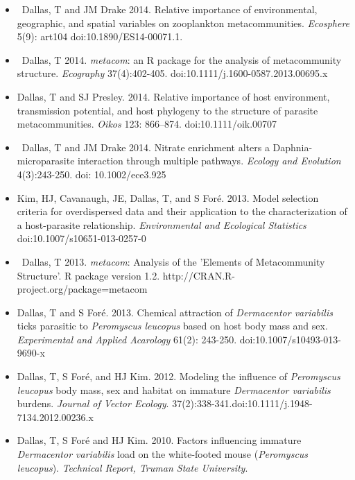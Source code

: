 \documentclass[]{CV}
\begin{document}
\begin{itemize}

\item \OA \ {\mefont Dallas, T} and JM Drake 2014. Relative importance of environmental, geographic, and spatial variables on zooplankton metacommunities. \textit{Ecosphere} 5(9): art104 doi:10.1890/ES14-00071.1.

\item \OA \ {\mefont Dallas, T} 2014. \textit{metacom}: an R package for the analysis of metacommunity structure. \textit{Ecography} 37(4):402-405. doi:10.1111/j.1600-0587.2013.00695.x

\item {\mefont Dallas, T} and SJ Presley. 2014. Relative importance of host environment, transmission potential, and host phylogeny to the structure of parasite metacommunities. \textit{Oikos} 123: 866–874. doi:10.1111/oik.00707

\item \OA \ {\mefont Dallas, T} and JM Drake 2014. Nitrate enrichment alters a Daphnia-microparasite interaction through multiple pathways. \textit{Ecology and Evolution} 4(3):243-250. doi: 10.1002/ece3.925

\item Kim, HJ, Cavanaugh, JE, {\mefont Dallas, T}, and S For\'e. 2013. Model selection criteria for overdispersed data and their application to the characterization of a host-parasite relationship. \textit{Environmental and Ecological Statistics} doi:10.1007/s10651-013-0257-0

\item \OA \ {\mefont Dallas, T} 2013. \textit{metacom}: Analysis of the 'Elements of Metacommunity Structure'. R package version 1.2. http://CRAN.R-project.org/package=metacom

\item {\mefont Dallas, T} and S For\'e. 2013. Chemical attraction of \textit{Dermacentor variabilis} ticks parasitic to \textit{Peromyscus leucopus} based on host body mass and sex. \textit{Experimental and Applied Acarology} 61(2): 243-250. doi:10.1007/s10493-013-9690-x

\item {\mefont Dallas, T}, S For\'e,  and  HJ Kim. 2012. Modeling the influence of \textit{Peromyscus leucopus} body mass, sex and habitat on immature \textit{Dermacentor variabilis} burdens. \textit{Journal of Vector Ecology}. 37(2):338-341.doi:10.1111/j.1948-7134.2012.00236.x

\item {\mefont Dallas, T}, S For\'e and HJ Kim. 2010. Factors influencing immature \textit{Dermacentor variabilis} load on the white-footed mouse (\textit{Peromyscus leucopus}). \textit{Technical Report, Truman State University}.
\end{itemize}
\end{document}
